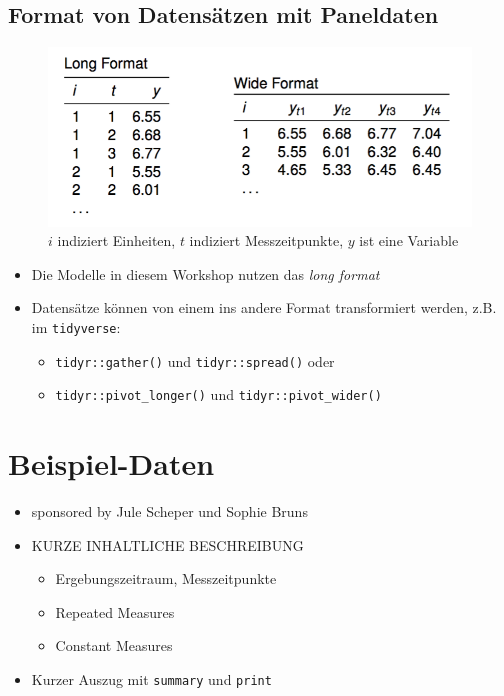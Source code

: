 \documentclass[]{book}
\providecommand{\tightlist}{%
  \setlength{\itemsep}{0pt}\setlength{\parskip}{0pt}}
\begin{document}
\hypertarget{format-von-datensuxe4tzen-mit-paneldaten}{%
\subsection*{Format von Datensätzen mit Paneldaten}\label{format-von-datensuxe4tzen-mit-paneldaten}}

\begin{figure}
\centering
\includegraphics{figs/longwide.png}
\caption{\(i\) indiziert Einheiten, \(t\) indiziert Messzeitpunkte, \(y\) ist eine Variable}
\end{figure}

\begin{itemize}
\item
  Die Modelle in diesem Workshop nutzen das \emph{long format}
\item
  Datensätze können von einem ins andere Format transformiert werden, z.B. im \texttt{tidyverse}:

  \begin{itemize}
  \tightlist
  \item
    \texttt{tidyr::gather()} und \texttt{tidyr::spread()} oder
  \item
    \texttt{tidyr::pivot\_longer()} und \texttt{tidyr::pivot\_wider()}
  \end{itemize}
\end{itemize}

\hypertarget{beispiel-daten}{%
\section{Beispiel-Daten}\label{beispiel-daten}}

\begin{itemize}
\item
  sponsored by Jule Scheper und Sophie Bruns
\item
  KURZE INHALTLICHE BESCHREIBUNG

  \begin{itemize}
  \tightlist
  \item
    Ergebungszeitraum, Messzeitpunkte
  \item
    Repeated Measures
  \item
    Constant Measures
  \end{itemize}
\item
  Kurzer Auszug mit \texttt{summary} und \texttt{print}
\end{itemize}
\end{document}
